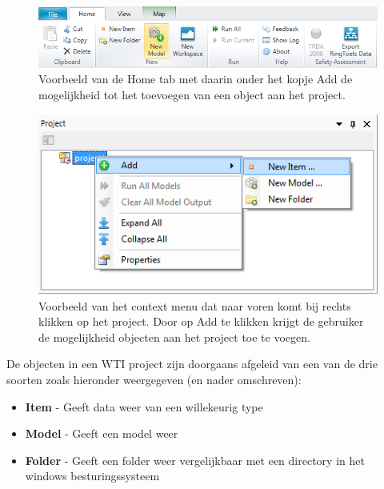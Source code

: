 \begin{figure}[H]
	\centering
		\includegraphics[width=1.0\textwidth]{figures/chapter_general/Home_Ribbon_Add_New_Model.png}
		\caption{Voorbeeld van de Home tab met daarin onder het kopje Add de mogelijkheid tot het toevoegen van een object aan het project.}
	\label{fig:wti_Add_Object}
\end{figure}
\begin{figure}[H]
	\centering
		\includegraphics{figures/chapter_general/wti_Add_Object_Project_Explorer.png}
		\caption{Voorbeeld van het context menu dat naar voren komt bij rechts klikken op het project. Door op Add te klikken krijgt de gebruiker de mogelijkheid objecten aan het project toe te voegen.}
	\label{fig:wti_Add_Object_Project_Explorer}
\end{figure}

De objecten in een WTI project zijn doorgaans afgeleid van een van de drie soorten zoals hieronder weergegeven (en nader omschreven):
\begin{itemize}
\item \textbf{Item} - Geeft data weer van een willekeurig type
\item \textbf{Model} - Geeft een model weer
\item \textbf{Folder} - Geeft een folder weer vergelijkbaar met een directory in het windows besturingssysteem
\end{itemize}

